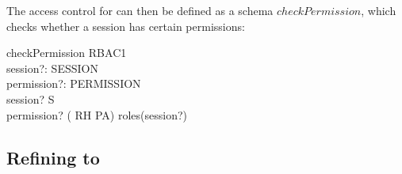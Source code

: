 The access control for \rbaci{} can then be defined as a schema
$checkPermission$, which checks whether a session has certain permissions:
\begin{schema}{checkPermission}
  RBAC1 \\
  session?: SESSION \\
  permission?: PERMISSION \\
  \where
  session? \in S \\
  permission? \in ( RH \comp PA\inv ) \limg roles(session?) \rimg \\
\end{schema}

\subsection{Refining \rbaci{} to \corbasec}


